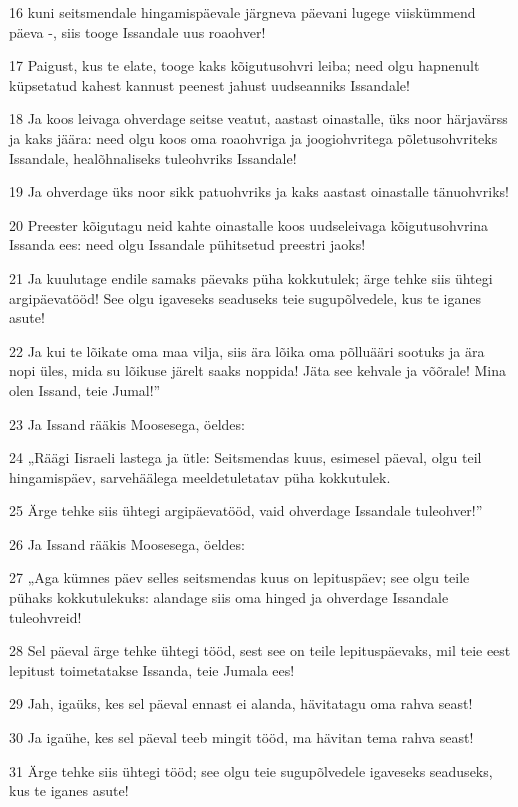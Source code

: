 \par 16 kuni seitsmendale hingamispäevale järgneva päevani lugege viiskümmend päeva -, siis tooge Issandale uus roaohver!
\par 17 Paigust, kus te elate, tooge kaks kõigutusohvri leiba; need olgu hapnenult küpsetatud kahest kannust peenest jahust uudseanniks Issandale!
\par 18 Ja koos leivaga ohverdage seitse veatut, aastast oinastalle, üks noor härjavärss ja kaks jäära: need olgu koos oma roaohvriga ja joogiohvritega põletusohvriteks Issandale, healõhnaliseks tuleohvriks Issandale!
\par 19 Ja ohverdage üks noor sikk patuohvriks ja kaks aastast oinastalle tänuohvriks!
\par 20 Preester kõigutagu neid kahte oinastalle koos uudseleivaga kõigutusohvrina Issanda ees: need olgu Issandale pühitsetud preestri jaoks!
\par 21 Ja kuulutage endile samaks päevaks püha kokkutulek; ärge tehke siis ühtegi argipäevatööd! See olgu igaveseks seaduseks teie sugupõlvedele, kus te iganes asute!
\par 22 Ja kui te lõikate oma maa vilja, siis ära lõika oma põlluääri sootuks ja ära nopi üles, mida su lõikuse järelt saaks noppida! Jäta see kehvale ja võõrale! Mina olen Issand, teie Jumal!”
\par 23 Ja Issand rääkis Moosesega, öeldes:
\par 24 „Räägi Iisraeli lastega ja ütle: Seitsmendas kuus, esimesel päeval, olgu teil hingamispäev, sarvehäälega meeldetuletatav püha kokkutulek.
\par 25 Ärge tehke siis ühtegi argipäevatööd, vaid ohverdage Issandale tuleohver!”
\par 26 Ja Issand rääkis Moosesega, öeldes:
\par 27 „Aga kümnes päev selles seitsmendas kuus on lepituspäev; see olgu teile pühaks kokkutulekuks: alandage siis oma hinged ja ohverdage Issandale tuleohvreid!
\par 28 Sel päeval ärge tehke ühtegi tööd, sest see on teile lepituspäevaks, mil teie eest lepitust toimetatakse Issanda, teie Jumala ees!
\par 29 Jah, igaüks, kes sel päeval ennast ei alanda, hävitatagu oma rahva seast!
\par 30 Ja igaühe, kes sel päeval teeb mingit tööd, ma hävitan tema rahva seast!
\par 31 Ärge tehke siis ühtegi tööd; see olgu teie sugupõlvedele igaveseks seaduseks, kus te iganes asute!
